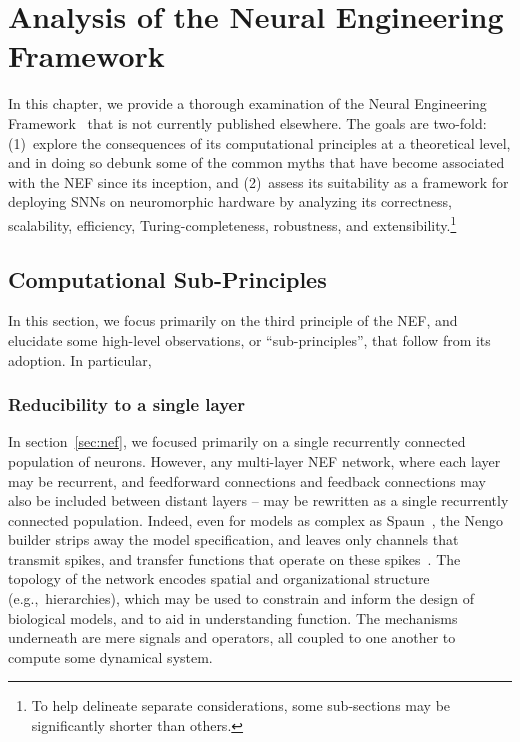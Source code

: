 \chapter{Analysis of the Neural Engineering Framework}
\label{chapt:analysis}

In this chapter, we provide a thorough examination of the Neural Engineering Framework~\citep[NEF;][]{eliasmith2003a} that is not currently published elsewhere.
The goals are two-fold: (1)~explore the consequences of its computational principles at a theoretical level, and in doing so debunk some of the common myths that have become associated with the NEF since its inception, and (2)~assess its suitability as a framework for deploying SNNs on neuromorphic hardware by analyzing its correctness, scalability, efficiency, Turing-completeness, robustness, and extensibility.\footnote{
To help delineate separate considerations, some sub-sections may be significantly shorter than others.
}

\section{Computational Sub-Principles}

In this section, we focus primarily on the third principle of the NEF, and elucidate some high-level observations, or ``sub-principles'', that follow from its adoption.
In particular, 

\subsection{Reducibility to a single layer}

In section~\ref{sec:nef}, we focused primarily on a single recurrently connected population of neurons.
However, any multi-layer NEF network, where each layer may be recurrent, and feedforward connections and feedback connections may also be included between distant layers -- may be rewritten as a single recurrently connected population.
Indeed, even for models as complex as Spaun~\citep{eliasmith2012, choo2018}, the Nengo builder strips away the model specification, and leaves only channels that transmit spikes, and transfer functions that operate on these spikes~\citep{bekolay2014, gosmann2017automatic}.
The topology of the network encodes spatial and organizational structure (e.g.,~hierarchies), which may be used to constrain and inform the design of biological models, and to aid in understanding function.
The mechanisms underneath are mere signals and operators, all coupled to one another to compute some dynamical system.

